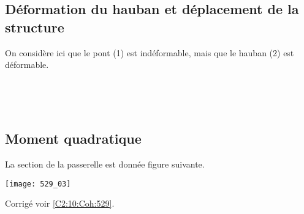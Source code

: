 \subsection*{Déformation du hauban et déplacement de la structure}
On considère ici que le pont (1) est indéformable, mais que le hauban (2) est déformable. 

\ifprof
\begin{corrige}~\\
\end{corrige}
\else
\fi

\ifprof
\begin{corrige}~\\
\end{corrige}
\else
\fi

\subsection*{Moment quadratique}
La section de la passerelle est donnée figure suivante. 
\begin{center}
\texttt{[image: 529\_03]}

\end{center}





\ifprof
\else
\begin{flushright}
\footnotesize{Corrigé  voir \ref{C2:10:Coh:529}.}
\end{flushright}%
\fi

